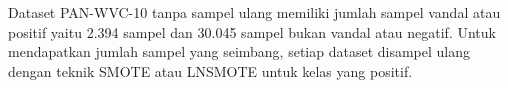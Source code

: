 Dataset PAN-WVC-10 tanpa sampel ulang memiliki jumlah sampel vandal atau
positif yaitu 2.394 sampel dan 30.045 sampel bukan vandal atau negatif.
Untuk mendapatkan jumlah sampel yang seimbang, setiap dataset disampel ulang
dengan teknik SMOTE atau LNSMOTE untuk kelas yang positif.
